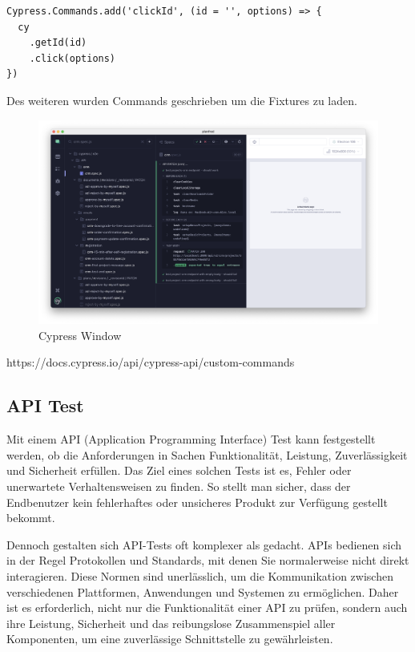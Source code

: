 \begin{lstlisting}
Cypress.Commands.add('clickId', (id = '', options) => {
  cy
    .getId(id)
    .click(options)
})
\end{lstlisting}

Des weiteren wurden Commands geschrieben um die Fixtures zu laden.

\begin{figure}[h!]
    \centering
    \includegraphics[width=1\linewidth]{pics/cypress-overview.png}
    \caption{Cypress Window}
    \label{fig:enter-label}
\end{figure}


https://docs.cypress.io/api/cypress-api/custom-commands


\cite{Cypress}
\subsection{API Test}
Mit einem API (Application Programming Interface) Test kann festgestellt werden, ob die Anforderungen in Sachen Funktionalität, Leistung, Zuverlässigkeit und Sicherheit erfüllen. Das Ziel eines solchen Tests ist es, Fehler oder unerwartete Verhaltensweisen zu finden. So stellt man sicher, dass der Endbenutzer kein fehlerhaftes oder unsicheres Produkt zur Verfügung gestellt bekommt. 

Dennoch gestalten sich API-Tests oft komplexer als gedacht. APIs bedienen sich in der Regel Protokollen und Standards, mit denen Sie normalerweise nicht direkt interagieren. Diese Normen sind unerlässlich, um die Kommunikation zwischen verschiedenen Plattformen, Anwendungen und Systemen zu ermöglichen. Daher ist es erforderlich, nicht nur die Funktionalität einer API zu prüfen, sondern auch ihre Leistung, Sicherheit und das reibungslose Zusammenspiel aller Komponenten, um eine zuverlässige Schnittstelle zu gewährleisten.

